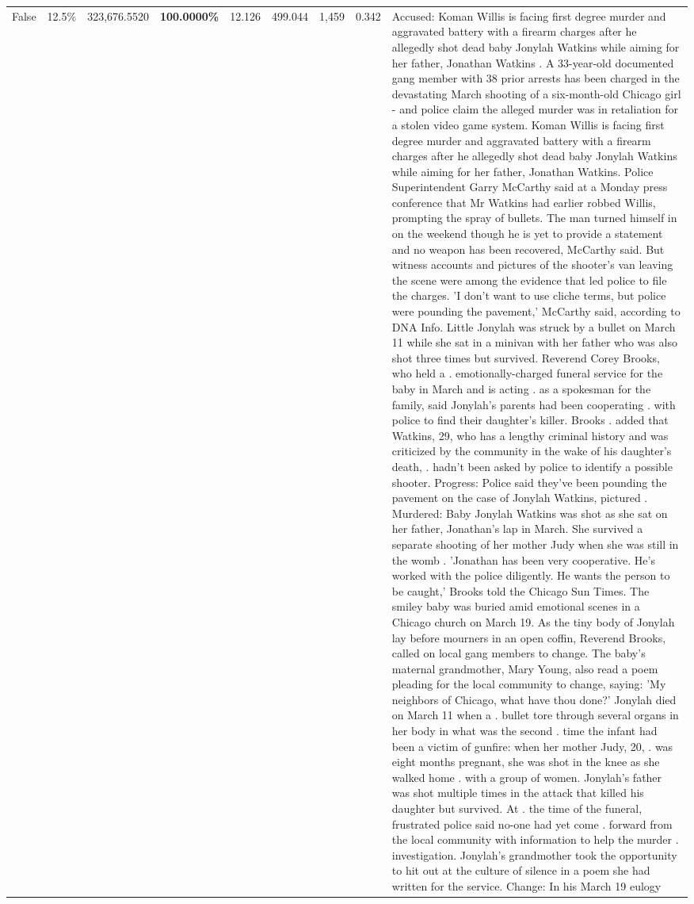 \begin{table}[H]
\begin{tabular}{lllrlllll}
False & 12.5\% & 323,676.5520 & \bfseries \color{red} 100.0000\% & 12.126 & 499.044 & 1,459 & 0.342 & Accused: Koman Willis is facing first degree murder and aggravated battery with a firearm charges after he allegedly shot dead baby Jonylah Watkins while aiming for her father, Jonathan Watkins . A 33-year-old documented gang member with 38 prior arrests has been charged in the devastating March shooting of a six-month-old Chicago girl - and police claim the alleged murder was in retaliation for a stolen video game system. Koman Willis is facing first degree murder and aggravated battery with a firearm charges after he allegedly shot dead baby Jonylah Watkins while aiming for her father, Jonathan Watkins. Police Superintendent Garry McCarthy said at a Monday press conference that Mr Watkins had earlier robbed Willis, prompting the spray of bullets. The man turned himself in on the weekend though he is yet to provide a statement and no weapon has been recovered, McCarthy said. But witness accounts and pictures of the shooter's van leaving the scene were among the evidence that led police to file the charges. 'I don't want to use cliche terms, but police were pounding the pavement,' McCarthy said, according to DNA Info. Little Jonylah was struck by a bullet on March 11 while she sat in a minivan with her father who was also shot three times but survived. Reverend Corey Brooks, who held a . emotionally-charged funeral service for the baby in March and is acting . as a spokesman for the family, said Jonylah's parents had been cooperating . with police to find their daughter's killer. Brooks . added that Watkins, 29, who has a lengthy criminal history and was criticized by the community in the wake of his daughter's death, . hadn't been asked by police to identify a possible shooter. Progress: Police said they've been pounding the pavement on the case of Jonylah Watkins, pictured . Murdered: Baby Jonylah Watkins was shot as she sat on her father, Jonathan's lap in March. She survived a separate shooting of her mother Judy when she was still in the womb . 'Jonathan has been very cooperative. He's worked with the police diligently. He wants the person to be caught,' Brooks told the Chicago Sun Times. The smiley baby was buried amid emotional scenes in a Chicago church on March 19. As the tiny body of Jonylah lay before mourners in an open coffin, Reverend Brooks, called on local gang members to change. The baby's maternal grandmother, Mary Young, also read a poem pleading for the local community to change, saying: 'My neighbors of Chicago, what have thou done?' Jonylah died on March 11 when a . bullet tore through several organs in her body in what was the second . time the infant had been a victim of gunfire: when her mother Judy, 20, . was eight months pregnant, she was shot in the knee as she walked home . with a group of women. Jonylah's father was shot multiple times in the attack that killed his daughter but survived. At . the time of the funeral, frustrated police said no-one had yet come . forward from the local community with information to help the murder . investigation. Jonylah's grandmother took the opportunity to hit out at the culture of silence in a poem she had written for the service. Change: In his March 19 eulogy 
\end{tabular}
\end{table}
